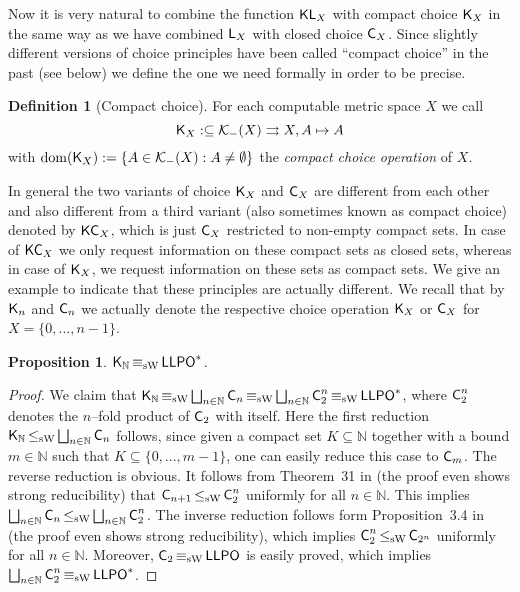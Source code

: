 \documentclass[a4paper]{amsart}
\def\KK{{\mathcal K}}
\def\IN{{\mathbb{N}}}
\def\In{\subseteq}
\def\mto{\rightrightarrows}
\def\dom{{\rm dom}}
\def\LLPO{\text{\rm\sffamily LLPO}}
\def\C{\mbox{\rm\sffamily C}}
\def\LLPO{\mbox{\rm\sffamily LLPO}}
\def\K{\text{\rm\sffamily K}}
\def\L{\text{\rm\sffamily L}}
\def\KL{\text{\rm\sffamily KL}}
\def\KC{\text{\rm\sffamily KC}}
\def\leqSW{\mathop{\leq_{\mathrm{sW}}}}
\def\equivSW{\mathop{\equiv_{\mathrm{sW}}}}
\newtheorem{proposition}[theorem]{Proposition}
\theoremstyle{definition}
\newtheorem{definition}[theorem]{Definition}
\begin{document}
Now it is very natural to combine the function $\KL_X$ with compact choice $\K_X$ in the same
way as we have combined $\L_X$ with closed choice $\C_X$. 
Since slightly different versions of choice principles have been called ``compact choice''
in the past (see below) we define the one we need formally in order to be precise.

\begin{definition}[Compact choice]
For each computable metric space $X$ we call 
\[\K_X:\In\KK_-(X)\mto X,A\mapsto A\]
with $\dom(\K_X):=\{A\in\KK_-(X):A\not=\emptyset\}$
the {\em compact choice operation} of $X$.
\end{definition}

In general the two variants of choice $\K_X$ and $\C_X$ are different from
each other and also different from a third variant (also sometimes known as compact choice) denoted by $\KC_X$, which is 
just $\C_X$ restricted to non-empty compact sets. In case of $\KC_X$ we only
request information on these compact sets as closed sets, whereas in case of $\K_X$,
we request information on these sets as compact sets. We give an example
to indicate that these principles are actually different. We recall that by $\K_n$
and $\C_n$ we actually denote the respective choice operation $\K_X$ or $\C_X$
for $X=\{0,...,n-1\}$.

\begin{proposition}
\label{pro:compact-choice-N}
$\K_\IN\equivSW\LLPO^*$.
\end{proposition}
\begin{proof}
We claim that $\K_\IN\equivSW\bigsqcup_{n\in\IN}\C_n\equivSW\bigsqcup_{n\in\IN}\C_2^n\equivSW\LLPO^*$,
where $\C_2^n$ denotes the $n$--fold product of $\C_2$ with itself.
Here the first reduction $\K_\IN\leqSW\bigsqcup_{n\in\IN}\C_n$ follows, since given a compact set $K\In\IN$
together with a bound $m\in\IN$ such that $K\In\{0,...,m-1\}$, one can easily reduce this
case to $\C_m$. The reverse reduction is obvious. 
It follows from Theorem~31 in \cite{Pau10} (the proof even shows strong reducibility) that $\C_{n+1}\leqSW\C_2^n$
uniformly for all $n\in\IN$.
This implies $\bigsqcup_{n\in\IN}\C_n\leqSW\bigsqcup_{n\in\IN}\C_2^n$.
The inverse reduction follows form Proposition~3.4 in \cite{BBP} (the proof even shows strong reducibility), which
implies $\C_2^n\leqSW\C_{2^n}$ uniformly for all $n\in\IN$.
Moreover, $\C_2\equivSW\LLPO$ is easily proved, which implies $\bigsqcup_{n\in\IN}\C_2^n\equivSW\LLPO^*$.
\end{proof}
\end{document}
